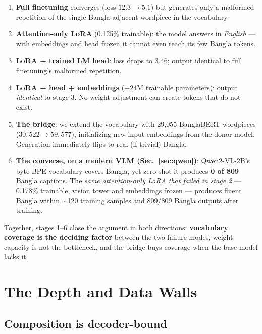 \documentclass[11pt]{article}
\begin{document}
\begin{enumerate}
  \item \textbf{Full finetuning} converges (loss $12.3 \to 5.1$) but
  generates only a malformed repetition of the single Bangla-adjacent
  wordpiece in the vocabulary.
  \item \textbf{Attention-only LoRA} (0.125\% trainable): the model
  answers in \emph{English} --- with embeddings and head frozen it
  cannot even reach its few Bangla tokens.
  \item \textbf{LoRA + trained LM head}: loss drops to 3.46; output
  identical to full finetuning's malformed repetition.
  \item \textbf{LoRA + head + embeddings} (+24M trainable parameters):
  output \emph{identical} to stage 3. No weight adjustment can create
  tokens that do not exist.
  \item \textbf{The bridge}: we extend the vocabulary with 29{,}055
  BanglaBERT wordpieces ($30{,}522 \to 59{,}577$), initializing new
  input embeddings from the donor model. Generation immediately flips
  to real (if trivial) Bangla.
  \item \textbf{The converse, on a modern VLM
  (Sec.~\ref{sec:qwen})}: Qwen2-VL-2B's byte-BPE vocabulary covers
  Bangla, yet zero-shot it produces \textbf{0 of 809} Bangla captions.
  The \emph{same attention-only LoRA that failed in stage 2} ---
  0.178\% trainable, vision tower and embeddings frozen --- produces
  fluent Bangla within $\sim$120 training samples and 809/809 Bangla
  outputs after training.
\end{enumerate}

Together, stages 1--6 close the argument in both directions:
\textbf{vocabulary coverage is the deciding factor} between the two
failure modes, weight capacity is not the bottleneck, and the bridge
buys coverage when the base model lacks it.

\section{The Depth and Data Walls}
\label{sec:depth}

\subsection{Composition is decoder-bound}
\end{document}
